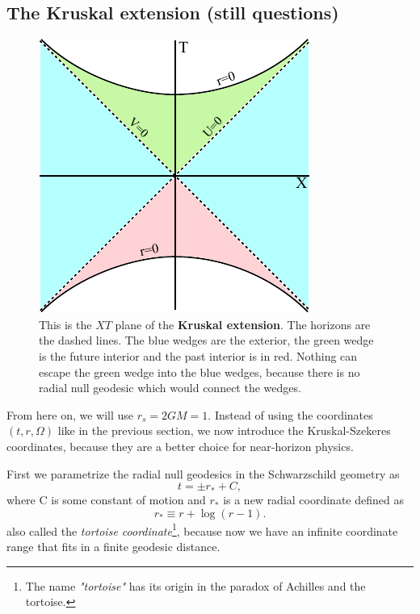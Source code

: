 \subsection{The Kruskal extension \checkmark (still questions)}
		\begin{figure}[htbp]
			\begin{center}
				\includegraphics[scale=1]{kruskal}
			\end{center}
			\caption{This is the $XT$ plane of the \textbf{Kruskal extension}. The horizons are the dashed lines. The {\color{blue} blue} wedges are the exterior, the {\color{forestgreen} green} wedge is the future interior and the past interior is in {\color{red} red}. Nothing can escape the {\color{forestgreen} green} wedge into the {\color{blue} blue} wedges, because there is no radial null geodesic which would connect the wedges.}\label{kruskal}	
		\end{figure}
	From here on, we will use $r_{s}=2GM=1$.
	Instead of using the coordinates $(t,r,\Omega)$ like in the previous section, we now introduce the Kruskal-Szekeres coordinates, because they are a better choice for near-horizon physics.
	
	First we parametrize the radial null geodesics in the Schwarzschild geometry as
		\begin{equation}
			t=\pm r_{*} + C,
		\end{equation}
	where C is some constant of motion and $r_{*}$ is a new radial coordinate defined as
		\begin{equation} \label{r_*tortoise}
			r_{*}\equiv r+\log (r-1).
		\end{equation}
	also called the \textit{tortoise coordinate}\footnote{The name \textit{"tortoise"} has its origin in the paradox of Achilles and the tortoise.}, because now we have an infinite coordinate range that fits in a finite geodesic distance.
		
